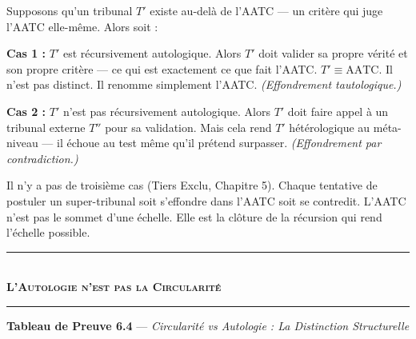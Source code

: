 \documentclass[10pt, openany, oneside]{book}
\renewcommand{\normalsize}{\fontsize{10}{13}\selectfont}
\begin{document}
Supposons qu'un tribunal $T'$ existe au-delà de l'AATC --- un critère qui juge l'AATC elle-même. Alors soit :

\textbf{Cas 1 :} $T'$ est récursivement autologique. Alors $T'$ doit valider sa propre vérité et son propre critère --- ce qui est exactement ce que fait l'AATC. $T' \equiv \text{AATC}$. Il n'est pas distinct. Il renomme simplement l'AATC. \textit{(Effondrement tautologique.)}

\textbf{Cas 2 :} $T'$ n'est pas récursivement autologique. Alors $T'$ doit faire appel à un tribunal externe $T''$ pour sa validation. Mais cela rend $T'$ hétérologique au méta-niveau --- il échoue au test même qu'il prétend surpasser. \textit{(Effondrement par contradiction.)}

Il n'y a pas de troisième cas (Tiers Exclu, Chapitre 5). Chaque tentative de postuler un super-tribunal soit s'effondre dans l'AATC soit se contredit. L'AATC n'est pas le sommet d'une échelle. Elle est la clôture de la récursion qui rend l'échelle possible.

\vspace{1.5em}


\begin{center}
    \rule{0.3\textwidth}{0.4pt}\\[0.5em]
    {\normalsize\bfseries\scshape L'Autologie n'est pas la Circularité}\\[0.3em]
    \rule{0.3\textwidth}{0.4pt}
\end{center}

\vspace{1em}

\textbf{Tableau de Preuve 6.4} --- \textit{Circularité vs Autologie : La Distinction Structurelle}

\vspace{0.5em}
\end{document}
